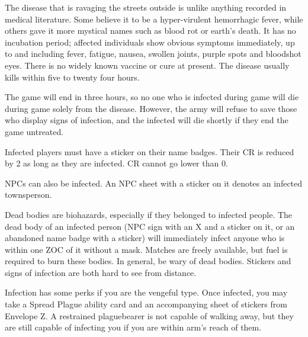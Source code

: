 \documentclass[green]{Pestilence}
\begin{document}
\name{\gInfection{}}

The disease that is ravaging the streets outside is unlike anything recorded in medical literature. Some believe it to be a hyper-virulent hemorrhagic fever, while others gave it more mystical names such as blood rot or earth's death. It has no incubation period; affected individuals show obvious symptoms immediately, up to and including fever, fatigue, nausea, swollen joints, purple spots and bloodshot eyes. There is no widely known vaccine or cure at present. The disease usually kills within five to twenty four hours.

The game will end in three hours, so no one who is infected during game will die during game solely from the disease. However, the army will refuse to save those who display signs of infection, and the infected will die shortly if they end the game untreated.

Infected players must have a sticker on their name badges. Their CR is reduced by 2 as long as they are infected. CR cannot go lower than 0.

NPCs can also be infected. An NPC sheet with a sticker on it denotes an infected townsperson.

Dead bodies are biohazards, especially if they belonged to infected people. The dead body of an infected person (NPC sign with an X and a sticker on it, or an abandoned name badge with a sticker) will immediately infect anyone who is within one ZOC of it without a mask. Matches are freely available, but fuel is required to burn these bodies. In general, be wary of dead bodies. Stickers and signs of infection are both hard to see from distance.

Infection has some perks if you are the vengeful type. Once infected, you may take a Spread Plague ability card and an accompanying sheet of stickers from Envelope Z. A restrained plaguebearer is not capable of walking away, but they are still capable of infecting you if you are within arm's reach of them.
\end{document}
